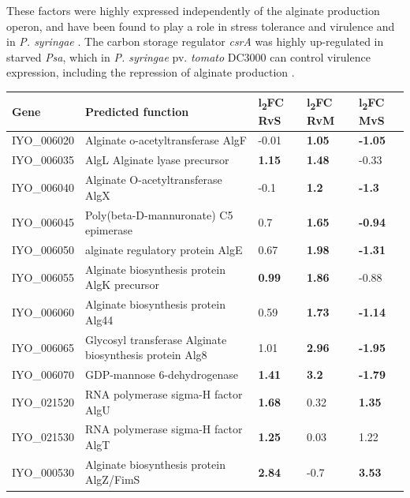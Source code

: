 These factors were highly expressed independently of the alginate production operon, and have been found to play a role in stress tolerance and virulence and in \textit{P. syringae} \citep{Schurr_Yu_Martinez-Salazar_Boucher_Deretic_1996,Schenk_Weingart_Ullrich_2008,Keith_Bender_1999,Baynham_Brown_Hall_Wozniak_1999}. The carbon storage regulator \textit{csrA} was highly up-regulated in starved \textit{Psa}, which in \textit{P. syringae} pv. \textit{tomato} DC3000 can control virulence expression, including the repression of alginate production \citep{Ferreiro_Nogales_Farias_Olmedilla_Sanjuan_Gallegos_2018}.
\begin{table}[H]
\footnotesize
    \centering
    \begin{tabular}{p{1.8cm}p{8cm}p{0.8cm}p{0.8cm}p{0.8cm}}\toprule
Gene & Predicted function & l\textsubscript{2}FC RvS  & l\textsubscript{2}FC RvM & l\textsubscript{2}FC MvS \\\midrule
IYO_006020 & Alginate o-acetyltransferase AlgF & -0.01 & \textbf{1.05} & \textbf{-1.05}\\
IYO_006035 & AlgL Alginate lyase precursor & \textbf{1.15} & \textbf{1.48} & -0.33\\
IYO_006040 & Alginate O-acetyltransferase AlgX & -0.1 & \textbf{1.2} &\textbf{-1.3}\\
IYO_006045 & Poly(beta-D-mannuronate) C5 epimerase & 0.7 & \textbf{1.65} &	\textbf{-0.94}\\
IYO_006050 & alginate regulatory protein AlgE & 0.67 & \textbf{1.98} & \textbf{-1.31}\\	
IYO_006055 & Alginate biosynthesis protein AlgK precursor & \textbf{0.99} & \textbf{1.86} & -0.88 \\
IYO_006060 & Alginate biosynthesis protein Alg44 & 0.59 & \textbf{1.73} & \textbf{-1.14} \\	
IYO_006065 & Glycosyl transferase	Alginate biosynthesis protein Alg8 &1.01 & \textbf{2.96} & \textbf{-1.95} \\
IYO_006070	& GDP-mannose 6-dehydrogenase & \textbf{1.41} & \textbf{3.2} & \textbf{-1.79}\\	
IYO_021520	& RNA polymerase sigma-H factor AlgU & \textbf{1.68} & 0.32 & \textbf{1.35}\\
IYO_021530	& RNA polymerase sigma-H factor AlgT & \textbf{1.25} & 0.03 & 1.22
\\
IYO_000530	& Alginate biosynthesis protein AlgZ/FimS & \textbf{2.84} & -0.7 & \textbf{3.53} \\

\end{tabular}
\end{table}
